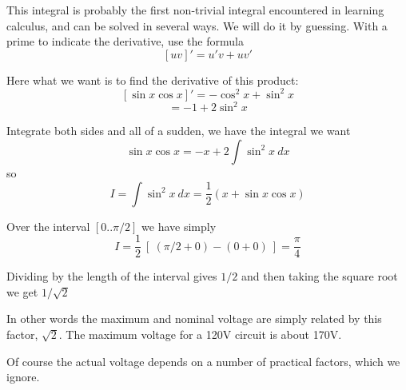 \documentclass[11pt, oneside]{article}
\begin{document}
This integral is probably the first non-trivial integral encountered in learning calculus, and can be solved in several ways.  We will do it by guessing.  With a prime to indicate the derivative, use the formula
\[ [uv ]' = u'v + uv' \]

Here what we want is to find the derivative of this product:
\[ [ \sin x \cos x ]' = - \cos^2 x + \sin^2 x \]
\[ = -1 + 2 \sin^2 x \]

Integrate both sides and all of a sudden, we have the integral we want
\[ \sin x \cos x = -x + 2 \int \sin^2 x \ dx \]
so
\[ I = \int \sin^2 x \ dx = \frac{1}{2} ( x + \sin x \cos x ) \]

Over the interval $[0 .. \pi/2]$ we have simply
\[ I = \frac{1}{2} \ [ \ (\pi/2 + 0) - (0 + 0) \ ] = \frac{\pi}{4} \]

Dividing by the length of the interval gives $1/2$ and then taking the square root we get $1/\sqrt{2}$

In other words the maximum and nominal voltage are simply related by this factor, $\sqrt{2}$.  The maximum voltage for a 120V circuit is about 170V.

Of course the actual voltage depends on a number of practical factors, which we ignore.
\end{document}
